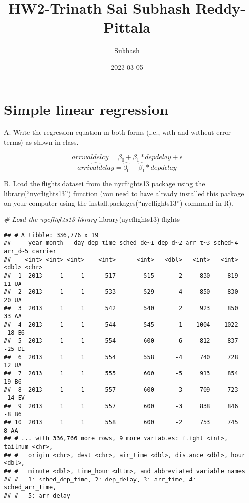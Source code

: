 \documentclass[
]{article}
\title{HW2-Trinath Sai Subhash Reddy-Pittala}
\author{Subhash}
\date{2023-03-05}
\newenvironment{Shaded}{\begin{snugshade}}{\end{snugshade}}
\newcommand{\CommentTok}[1]{\textcolor[rgb]{0.56,0.35,0.01}{\textit{#1}}}
\newcommand{\FunctionTok}[1]{\textcolor[rgb]{0.00,0.00,0.00}{#1}}
\newcommand{\NormalTok}[1]{#1}
\begin{document}
\maketitle

\hypertarget{simple-linear-regression}{%
\section{Simple linear regression}\label{simple-linear-regression}}

A. Write the regression equation in both forms (i.e., with and without
error terms) as shown in class.

\[
arrivaldelay = \beta_{0} + \beta_{1} * depdelay + \epsilon
\] \[
\hat{arrivaldelay} = \hat{\beta_{0}} + \hat{\beta_{1}} * depdelay
\]

B. Load the flights dataset from the nycflights13 package using the
library(``nycflights13'') function (you need to have already installed
this package on your computer using the
install.packages(``nycflights13'') command in R).

\begin{Shaded}
\begin{Highlighting}[]
\CommentTok{\# Load the nycflights13 library}
\FunctionTok{library}\NormalTok{(nycflights13)}
\NormalTok{flights}
\end{Highlighting}
\end{Shaded}

\begin{verbatim}
## # A tibble: 336,776 x 19
##     year month   day dep_time sched_de~1 dep_d~2 arr_t~3 sched~4 arr_d~5 carrier
##    <int> <int> <int>    <int>      <int>   <dbl>   <int>   <int>   <dbl> <chr>  
##  1  2013     1     1      517        515       2     830     819      11 UA     
##  2  2013     1     1      533        529       4     850     830      20 UA     
##  3  2013     1     1      542        540       2     923     850      33 AA     
##  4  2013     1     1      544        545      -1    1004    1022     -18 B6     
##  5  2013     1     1      554        600      -6     812     837     -25 DL     
##  6  2013     1     1      554        558      -4     740     728      12 UA     
##  7  2013     1     1      555        600      -5     913     854      19 B6     
##  8  2013     1     1      557        600      -3     709     723     -14 EV     
##  9  2013     1     1      557        600      -3     838     846      -8 B6     
## 10  2013     1     1      558        600      -2     753     745       8 AA     
## # ... with 336,766 more rows, 9 more variables: flight <int>, tailnum <chr>,
## #   origin <chr>, dest <chr>, air_time <dbl>, distance <dbl>, hour <dbl>,
## #   minute <dbl>, time_hour <dttm>, and abbreviated variable names
## #   1: sched_dep_time, 2: dep_delay, 3: arr_time, 4: sched_arr_time,
## #   5: arr_delay
\end{verbatim}
\end{document}
